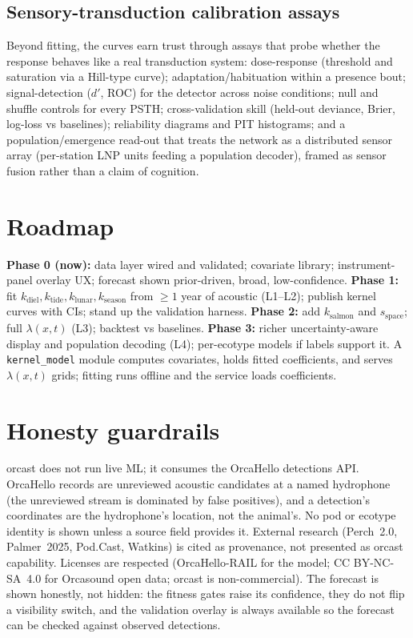 \documentclass[11pt]{article}
\begin{document}
\subsection{Sensory-transduction calibration assays}
Beyond fitting, the curves earn trust through assays that probe whether the
response behaves like a real transduction system: dose-response (threshold and
saturation via a Hill-type curve); adaptation/habituation within a presence
bout; signal-detection ($d'$, ROC) for the detector across noise conditions;
null and shuffle controls for every PSTH; cross-validation skill (held-out
deviance, Brier, log-loss vs baselines); reliability diagrams and PIT histograms;
and a population/emergence read-out that treats the network as a distributed
sensor array (per-station LNP units feeding a population decoder), framed as
sensor fusion rather than a claim of cognition.

\section{Roadmap}
\textbf{Phase 0 (now):} data layer wired and validated; covariate library;
instrument-panel overlay UX; forecast shown prior-driven, broad, low-confidence.
\textbf{Phase 1:} fit $k_{\text{diel}}, k_{\text{tide}}, k_{\text{lunar}},
k_{\text{season}}$ from $\geq 1$ year of acoustic (L1--L2); publish kernel curves
with CIs; stand up the validation harness. \textbf{Phase 2:} add
$k_{\text{salmon}}$ and $s_{\text{space}}$; full $\lambda(x,t)$ (L3); backtest vs
baselines. \textbf{Phase 3:} richer uncertainty-aware display and population
decoding (L4); per-ecotype models if labels support it. A \texttt{kernel\_model}
module computes covariates, holds fitted coefficients, and serves $\lambda(x,t)$
grids; fitting runs offline and the service loads coefficients.

\section{Honesty guardrails}
orcast does not run live ML; it consumes the OrcaHello detections API. OrcaHello
records are unreviewed acoustic candidates at a named hydrophone (the unreviewed
stream is dominated by false positives), and a detection's coordinates are the
hydrophone's location, not the animal's. No pod or ecotype identity is shown
unless a source field provides it. External research (Perch~2.0, Palmer~2025,
Pod.Cast, Watkins) is cited as provenance, not presented as orcast capability.
Licenses are respected (OrcaHello-RAIL for the model; CC BY-NC-SA~4.0 for
Orcasound open data; orcast is non-commercial). The forecast is shown honestly,
not hidden: the fitness gates raise its confidence, they do not flip a visibility
switch, and the validation overlay is always available so the forecast can be
checked against observed detections.
\end{document}
